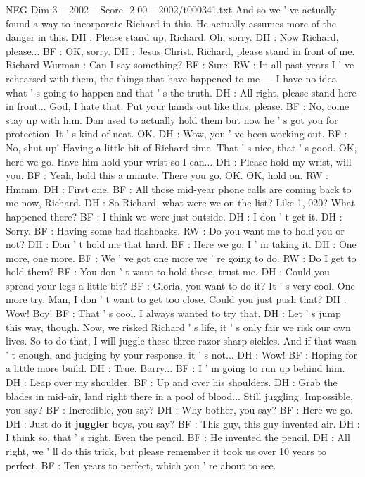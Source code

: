 \begin{textsample}{NEG Dim 3 – 2002 – Score -2.00 – 2002/t000341.txt}
And so we ' ve actually found a way to incorporate Richard in this.
He actually assumes more of the danger in this.
DH : Please stand up, Richard.
Oh, sorry.
DH : Now Richard, please...
BF : OK, sorry.
DH : Jesus Christ.
Richard, please stand in front of me.
Richard Wurman : Can I say something?
BF : Sure.
RW : In all past years I ' ve rehearsed with them, the things that have happened to me — I have no idea what ' s going to happen and that ' s the truth.
DH : All right, please stand here in front...
God, I hate that.
Put your hands out like this, please.
BF : No, come stay up with him.
Dan used to actually hold them but now he ' s got you for protection.
It ' s kind of neat.
OK.
DH : Wow, you ' ve been working out.
BF : No, shut up!
Having a little bit of Richard time.
That ' s nice, that ' s good.
OK, here we go.
Have him hold your wrist so I can...
DH : Please hold my wrist, will you.
BF : Yeah, hold this a minute.
There you go.
OK.
OK, hold on.
RW : Hmmm.
DH : First one.
BF : All those mid-year phone calls are coming back to me now, Richard.
DH : So Richard, what were we on the list?
Like 1, 020?
What happened there?
BF : I think we were just outside.
DH : I don ' t get it.
DH : Sorry.
BF : Having some bad flashbacks.
RW : Do you want me to hold you or not?
DH : Don ' t hold me that hard.
BF : Here we go, I ' m taking it.
DH : One more, one more.
BF : We ' ve got one more we ' re going to do.
RW : Do I get to hold them?
BF : You don ' t want to hold these, trust me.
DH : Could you spread your legs a little bit?
BF : Gloria, you want to do it?
It ' s very cool.
One more try.
Man, I don ' t want to get too close.
Could you just push that?
DH : Wow!
Boy!
BF : That ' s cool.
I always wanted to try that.
DH : Let ' s jump this way, though.
Now, we risked Richard ' s life, it ' s only fair we risk our own lives.
So to do that, I will juggle these three razor-sharp sickles.
And if that wasn ' t enough, and judging by your response, it ' s not...
DH : Wow!
BF : Hoping for a little more build.
DH : True.
Barry...
BF : I ' m going to run up behind him.
DH : Leap over my shoulder.
BF : Up and over his shoulders.
DH : Grab the blades in mid-air, land right there in a pool of blood...
Still juggling.
Impossible, you say?
BF : Incredible, you say?
DH : Why bother, you say?
BF : Here we go.
DH : Just do it \textbf{juggler} boys, you say?
BF : This guy, this guy invented air.
DH : I think so, that ' s right.
Even the pencil.
BF : He invented the pencil.
DH : All right, we ' ll do this trick, but please remember it took us over 10 years to perfect.
BF : Ten years to perfect, which you ' re about to see.

\end{textsample}
